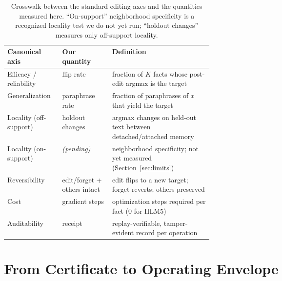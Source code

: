 \documentclass[11pt]{article}
\theoremstyle{remark}
\begin{document}
\begin{table}[t]
\centering
\small
\begin{tabular}{@{}l l >{\raggedright\arraybackslash}p{0.49\linewidth}@{}}
\toprule
Canonical axis & Our quantity & Definition \\
\midrule
Efficacy / reliability & flip rate & fraction of $K$ facts whose post-edit argmax is the target \\
Generalization & paraphrase rate & fraction of paraphrases of $x$ that yield the target \\
Locality (off-support) & holdout changes & argmax changes on held-out text between detached/attached memory \\
Locality (on-support) & \emph{(pending)} & neighborhood specificity; not yet measured (Section~\ref{sec:limits}) \\
Reversibility & edit/forget + others-intact & edit flips to a new target; forget reverts; others preserved \\
Cost & gradient steps & optimization steps required per fact ($0$ for HLM5) \\
Auditability & receipt & replay-verifiable, tamper-evident record per operation \\
\bottomrule
\end{tabular}
\caption{Crosswalk between the standard editing axes and the quantities measured
here. ``On-support'' neighborhood specificity is a recognized locality test we do
not yet run; ``holdout changes'' measures only off-support locality.}
\label{tab:crosswalk}
\end{table}

\section{From Certificate to Operating Envelope}
\label{sec:envelope}
\end{document}
